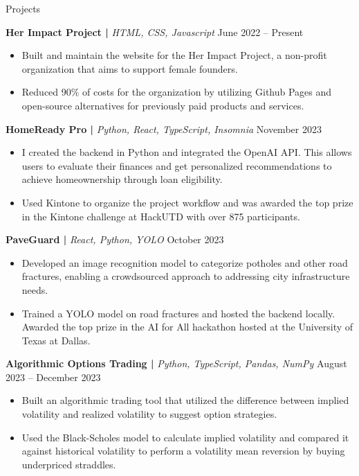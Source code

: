 \documentclass[]{mcdowellcv}
\begin{document}
	\begin{cvsection}{Projects}
		\begin{cvsubsection}{}{}{}	
				\textbf{Her Impact Project | }\textit{HTML, CSS, Javascript} \hfill{June 2022 -- Present}
				\begin{itemize}
					\item Built and maintain the website for the Her Impact Project, a non-profit organization that aims to support female founders.
					\smallskip
					\item Reduced 90\% of costs for the organization by utilizing Github Pages and open-source alternatives for previously paid products and services.
				\end{itemize}
				\medskip
				\textbf{HomeReady Pro | }\textit{Python, React, TypeScript, Insomnia} \hfill{November 2023} 
				\begin{itemize}
					\item I created the backend in Python and integrated the OpenAI API. This allows users to evaluate their finances and get personalized recommendations to achieve homeownership through loan eligibility. 
					\smallskip
					\item Used Kintone to organize the project workflow and was awarded the top prize in the Kintone challenge at HackUTD with over 875 participants.
				\end{itemize}
				\medskip
				\textbf{PaveGuard | }\textit{React, Python, YOLO} \hfill{October 2023}
				\begin{itemize}
					\item Developed an image recognition model to categorize potholes and other road fractures, enabling a crowdsourced approach to addressing city infrastructure needs.
					\smallskip
					\item Trained a YOLO model on road fractures and hosted the backend locally. Awarded the top prize in the AI for All hackathon hosted at the University of Texas at Dallas.
				\end{itemize}
				\medskip
				\textbf{Algorithmic Options Trading | }\textit{Python, TypeScript, Pandas, NumPy} \hfill{August 2023 -- December 2023}
				\begin{itemize}
					\item Built an algorithmic trading tool that utilized the difference between implied volatility and realized volatility to suggest option strategies.
					\smallskip
					\item Used the Black-Scholes model to calculate implied volatility and compared it against historical volatility to perform a volatility mean reversion by buying underpriced straddles.
				\end{itemize}
		\end{cvsubsection}
	\end{cvsection}
\end{document}
